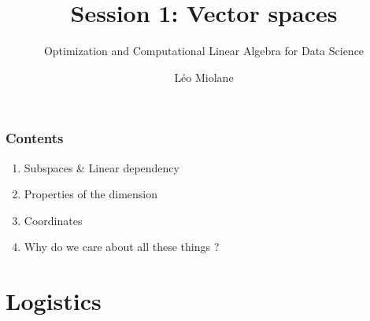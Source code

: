 \documentclass{beamer}
\title{Session 1: Vector spaces}
\subtitle{Optimization and Computational Linear Algebra for Data Science}
\author{Léo Miolane}
\date{}
\begin{document}
\setcounter{showProgressBar}{0}
\setcounter{showSlideNumbers}{0}

\frame{\titlepage}

\begin{frame}
	\frametitle{Contents}
	\begin{enumerate}
		\item Subspaces \& Linear dependency
		\item Properties of the dimension
		\item Coordinates
		\item Why do we care about all these things ? 
	\end{enumerate}
\end{frame}


\setcounter{framenumber}{0}
\setcounter{showSlideNumbers}{1}

\section{Logistics}
\end{document}
